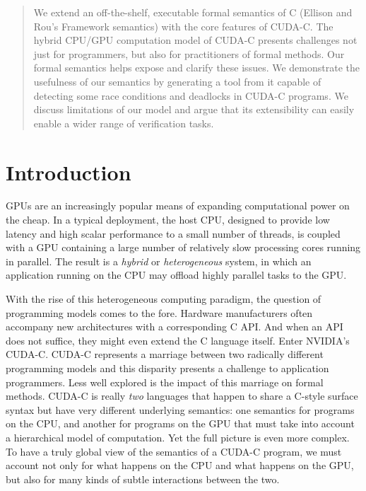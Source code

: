 \newcommand{\edit}[1]{\marginpar{{\tiny{\it #1}}}}
\begin{abstract}

We extend an off-the-shelf, executable formal semantics of C (Ellison and
Rou's \K Framework semantics) with the core features of CUDA-C. 
The hybrid CPU/GPU computation model of CUDA-C presents challenges not just for
programmers, but also for practitioners of formal methods. 
Our formal semantics helps expose and clarify these issues. 
We demonstrate the usefulness of our semantics by generating a tool from it
capable of detecting some race conditions and deadlocks in CUDA-C programs. 
We discuss limitations of our model and argue that its extensibility can easily
enable a wider range of verification tasks. 

\end{abstract}

\section{Introduction}

GPUs are an increasingly popular means of expanding computational power on the
cheap. In a typical deployment, the host CPU, designed to provide low latency
and high scalar performance to a small number of threads, is coupled with a GPU
containing a large number of relatively slow processing cores running in
parallel. The result is a {\em hybrid} or {\em heterogeneous} system, in which
an application running on the CPU may offload highly parallel tasks to the GPU. 

With the rise of this heterogeneous computing paradigm, the question of
programming models comes to the fore. 
Hardware manufacturers often accompany new architectures with a corresponding C
API.
And when an API does not suffice, they might even extend the C language itself.
Enter NVIDIA's CUDA-C. CUDA-C represents a marriage between two radically
different programming models and this disparity presents a challenge to
application programmers. Less well explored is the impact of this marriage on
formal methods. CUDA-C is really {\em two} languages that happen to share a
C-style surface syntax but have very different underlying semantics: one
semantics for programs on the CPU, and another for programs on the GPU that must
take into account a hierarchical model of computation. Yet the full picture is
even more complex. To have a truly global view of the semantics of a CUDA-C
program, we must account not only for what happens on the CPU and what happens
on the GPU, but also for many kinds of subtle interactions between the two.

